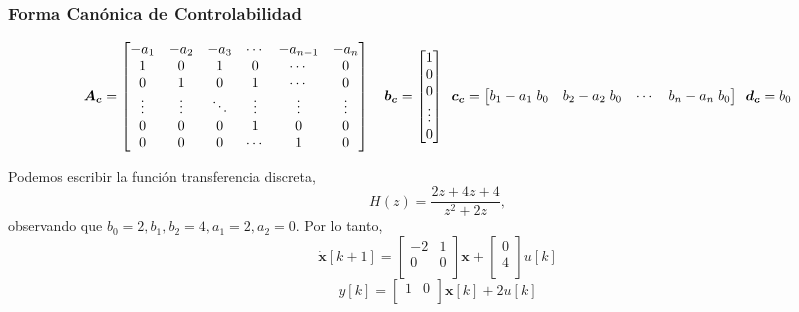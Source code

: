 \subsubsection*{Forma Canónica de Controlabilidad}
\begin{equation*}
    \bm{A_c} = 
    \begin{bmatrix}
    -a_1 & -a_2 & -a_3 & \cdots & -a_{n-1} & -a_n\\
    1 & 0 & 1 & 0 & \cdots & 0\\
    0 & 1 & 0 & 1 & \cdots & 0\\
    \vdots & \vdots & \ddots & \vdots & \vdots & \vdots \\
    0 & 0 & 0 & 1 & 0 & 0\\
    0 & 0 & 0 & \cdots & 1 & 0 \\
    \end{bmatrix}
    \hspace*{10pt}
    \bm{b_c} = 
    \begin{bmatrix}
    1 \\
    0 \\
    0 \\
    \vdots \\
    0\\
    \end{bmatrix}
    \hspace*{5pt}
    \bm{c_c} = 
    \begin{bmatrix}
    b_1 - a_1\; b_0 & b_2 - a_2\; b_0 & \cdots & b_n - a_n\; b_0
    \end{bmatrix}
    \hspace*{5pt}
    \bm{d_c} = b_0
\end{equation*}


\begin{example}
    Podemos escribir la función transferencia discreta,
    \begin{equation*}
        H(z) = \dfrac{2 z + 4 z + 4}{z^2 + 2 z},
    \end{equation*}
    observando que \( b_0 = 2, b_1, b_2 = 4, a_1=2, a_2=0\). Por lo tanto,
    \begin{equation*}
        \bm{\dot{x}}[k+1] = 
        \begin{bmatrix}
        -2 & 1\\
        0 & 0\\
        \end{bmatrix}
        \bm{x} +
        \begin{bmatrix}
        0 \\
        4 \\
        \end{bmatrix}
        u[k]
    \end{equation*}
    \begin{equation*}
        y[k] = \begin{bmatrix}
        1 & 0 \\
        \end{bmatrix}
        \bm{x}[k]
        + 2 u[k]
    \end{equation*}
\end{example}

